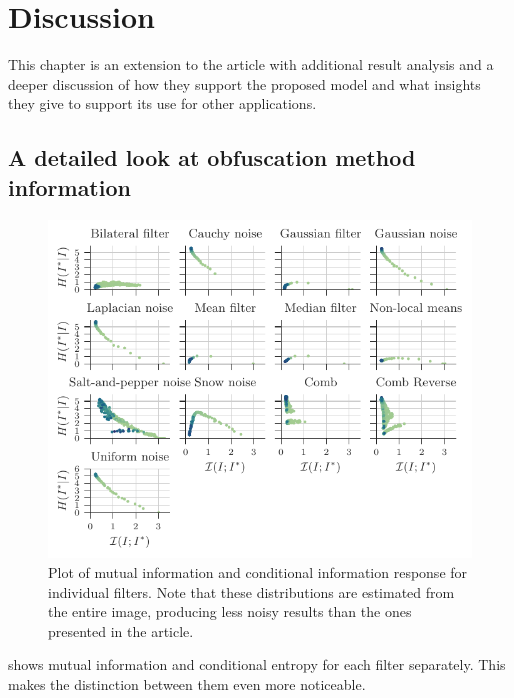 \chapter{Discussion}
This chapter is an extension to the article with additional result analysis and a deeper discussion of how they support the proposed model and what insights they give to support its use for other applications.

\section{A detailed look at obfuscation method information}
\begin{figure}
	\centering
	
	\includegraphics[width=1\textwidth]{figures/results/individual}
	
	\caption{Plot of mutual information and conditional information response for individual filters. Note that these distributions are estimated from the entire image, producing less noisy results than the ones presented in the article.}\label{fig:individual}
\end{figure}

 shows mutual information and conditional entropy for each filter separately. This makes the distinction between them even more noticeable. 

